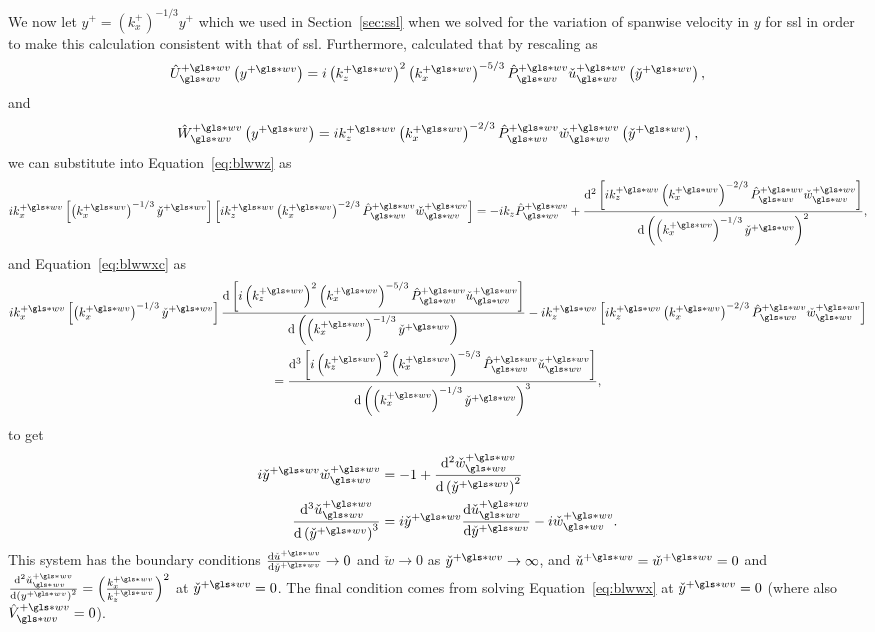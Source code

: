 We now let $y^{+}=\left( k_x^{+} \right) ^{-1 /3}y^{+}$ which we used in Section~\ref{sec:ssl} when we solved for the variation of spanwise velocity in $y$ for  \gls*{ssl} in order to make this calculation consistent with that of \gls*{ssl}. Furthermore, \textcite{chernyshenko2013} calculated that by rescaling as
\begin{equation}
	\hat{U}\pw\ww \left( y\pw \right)  = i\left( k_z\pw \right) ^2 \left( k_x\pw \right) ^{-5 /3}  \hat{P}\pw\ww \check{u}\pw\ww \left( \check{y}\pw \right)
,\end{equation}
and
\begin{equation}
	\hat{W}\pw\ww \left( y\pw \right) = ik_z\pw \left( k_x\pw \right) ^{-2 /3}\hat{P}\pw\ww \check{w}\pw\ww \left( \check{y}\pw \right)
,\end{equation}
we can substitute into Equation~\eqref{eq:blwwz} as
\begin{equation*}
	ik_x\pw \left[ \left( k_x\pw \right) ^{-1 /3} \check{y}\pw\right] \left[ i k_z\pw \left( k_x\pw \right) ^{-2 /3}\hat{P}\pw\ww \check{w}\pw\ww \right] = -ik_z \hat{P}\ww\pw\nonumber+\dv[2]{\left[i k_z\pw \left( k_x\pw \right) ^{-2 /3}\hat{P}\pw\ww \check{w}\pw\ww\right]}{\left(\left( k_x\pw \right) ^{-1 /3} \check{y}\pw\right)}
,\end{equation*}
and Equation~\eqref{eq:blwwxc} as
\begin{multline*}
	ik_x\pw \left[ \left( k_x\pw \right) ^{-1 /3} \check{y}\pw\right]\dv{\left[i\left( k_z\pw \right) ^2 \left( k_x\pw \right) ^{-5 /3}  \hat{P}\pw\ww \check{u}\pw\ww \right]}{\left( \left( k_x\pw \right) ^{-1 /3} \check{y}\pw\right)} - ik_z\pw \left[ ik_z\pw \left( k_x\pw \right) ^{-2 /3}\hat{P}\pw\ww \check{w}\pw\ww \right] \\
	=\dv[3]{\left[i\left( k_z\pw \right) ^2 \left( k_x\pw \right) ^{-5 /3}  \hat{P}\pw\ww \check{u}\pw\ww \right]}{\left( \left( k_x\pw \right) ^{-1 /3} \check{y}\pw\right)}
,\end{multline*}
to get
\begin{align}
	i\check{y}\pw \check{w}\pw\ww&=-1+\dv[2]{\check{w}\pw\ww}{\left( \check{y}\pw \right) }\label{eq:blwwzsim} \\
	\dv[3]{\check{u}\pw\ww}{\left( \check{y}\pw \right) } &= i\check{y}\pw \dv{\check{u}\pw\ww}{\check{y}\pw} -i\check{w}\pw\ww\label{eq:blwwxsim}
.\end{align}
This system has the boundary conditions $\dv{\check{u}\pw}{\check{y}\pw}\to0 $ and $\check{w}\to0$ as $\check{y}\pw\to\infty$, and $\check{u}\pw=\check{w}\pw=0$ and $\dv[2]{\check{u}\pw\ww}{\left( y\pw \right) } =\left(\frac{k_x\pw}{k_z\pw}\right)^2$ at $\check{y}\pw=0$. The final condition comes from solving Equation~\eqref{eq:blwwx} at $\check{y}\pw=0$ (where also $\hat{V}\pw\ww=0$).

